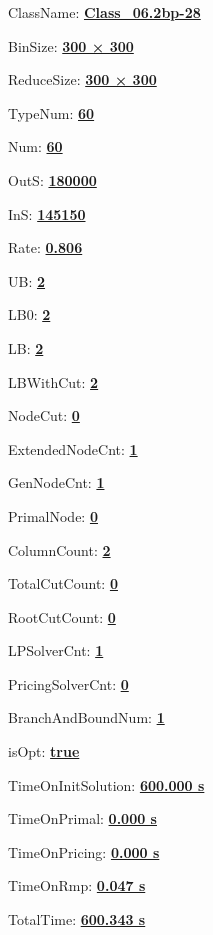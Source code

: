 \documentclass[11pt]{article}
\begin{document}
\pagestyle{empty}


ClassName: \underline{\textbf{Class_06.2bp-28}}
\par
BinSize: \underline{\textbf{300 × 300}}
\par
ReduceSize: \underline{\textbf{300 × 300}}
\par
TypeNum: \underline{\textbf{60}}
\par
Num: \underline{\textbf{60}}
\par
OutS: \underline{\textbf{180000}}
\par
InS: \underline{\textbf{145150}}
\par
Rate: \underline{\textbf{0.806}}
\par
UB: \underline{\textbf{2}}
\par
LB0: \underline{\textbf{2}}
\par
LB: \underline{\textbf{2}}
\par
LBWithCut: \underline{\textbf{2}}
\par
NodeCut: \underline{\textbf{0}}
\par
ExtendedNodeCnt: \underline{\textbf{1}}
\par
GenNodeCnt: \underline{\textbf{1}}
\par
PrimalNode: \underline{\textbf{0}}
\par
ColumnCount: \underline{\textbf{2}}
\par
TotalCutCount: \underline{\textbf{0}}
\par
RootCutCount: \underline{\textbf{0}}
\par
LPSolverCnt: \underline{\textbf{1}}
\par
PricingSolverCnt: \underline{\textbf{0}}
\par
BranchAndBoundNum: \underline{\textbf{1}}
\par
isOpt: \underline{\textbf{true}}
\par
TimeOnInitSolution: \underline{\textbf{600.000 s}}
\par
TimeOnPrimal: \underline{\textbf{0.000 s}}
\par
TimeOnPricing: \underline{\textbf{0.000 s}}
\par
TimeOnRmp: \underline{\textbf{0.047 s}}
\par
TotalTime: \underline{\textbf{600.343 s}}
\par
\newpage
\end{document}
